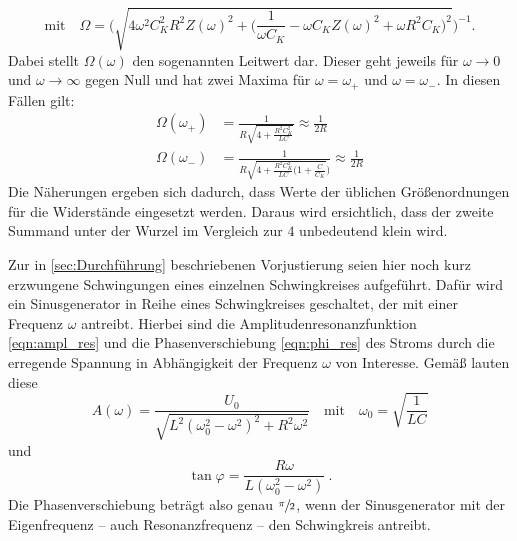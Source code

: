 \begin{equation}
    \text{mit} \quad \Omega = \Biggl(\sqrt{4 \omega ^2 C_K^2 R^2 Z(\omega)^2 + \bigl(\frac{1}{\omega C_K} - \omega C_K Z(\omega)^2 + \omega R^2 C_K\bigr)^2 }\Biggr)^{-1} .
\end{equation}
Dabei stellt $\Omega (\omega)$ den sogenannten Leitwert dar. 
Dieser geht jeweils für ${\omega \to 0}$ und ${\omega \to \infty }$ gegen Null und hat zwei Maxima für ${\omega = \omega _+}$ und 
${\omega = \omega _-}$. 
In diesen Fällen gilt:
\begin{align}
    \Omega (\omega _+) &= \frac{1}{R\sqrt{4 + \frac{R^2C_K^2}{LC}}} \approx \frac{1}{2R} \\
    \Omega (\omega _-) &= \frac{1}{R\sqrt{4 + \frac{R^2C_K^2}{LC}(1 + \frac{C}{C_K}})} \approx \frac{1}{2R}  
\end{align}
Die Näherungen ergeben sich dadurch, dass Werte der üblichen Größenordnungen für die Widerstände eingesetzt werden.
Daraus wird ersichtlich, dass der zweite Summand unter der Wurzel im Vergleich zur $4$ unbedeutend klein wird. 

Zur in \ref{sec:Durchführung} beschriebenen Vorjustierung seien hier noch kurz erzwungene Schwingungen eines einzelnen 
Schwingkreises aufgeführt. 
Dafür wird ein Sinusgenerator in Reihe eines Schwingkreises geschaltet, der mit einer Frequenz $\omega$ antreibt. 
Hierbei sind die Amplitudenresonanzfunktion \eqref{eqn:ampl_res} und die Phasenverschiebung \eqref{eqn:phi_res} des Stroms 
durch die erregende Spannung in 
Abhängigkeit der Frequenz $\omega$ von Interesse. 
Gemäß \cite{gerthsen} lauten diese 
\begin{equation}
    A(\omega)=\frac{U_0}{\sqrt{L^2(\omega _0^2 -\omega^2)^2 +R^2\omega^2}} \quad \text{mit} \quad 
    \omega _0=\sqrt{\frac{1}{LC}}
    \label{eqn:ampl_res}
\end{equation}
und 
\begin{equation}
    \tan \varphi=\frac{R\omega}{L(\omega _0^2 -\omega^2)}\: .
    \label{eqn:phi_res}
\end{equation}
Die Phasenverschiebung beträgt also genau $\sfrac{\pi}{2}$, wenn der Sinusgenerator mit der Eigenfrequenz -- auch 
Resonanzfrequenz -- den Schwingkreis antreibt. 